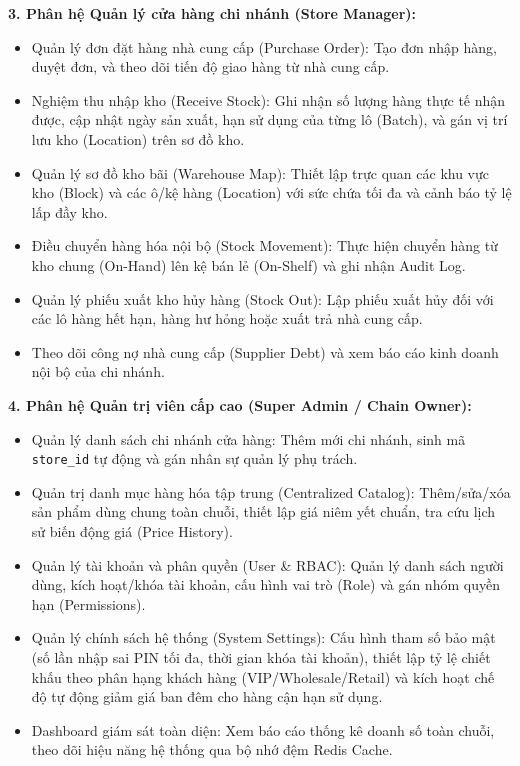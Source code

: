 \documentclass[12pt,a4paper]{report}
\begin{document}
\textbf{3. Phân hệ Quản lý cửa hàng chi nhánh (Store Manager):}
\begin{itemize}[leftmargin=1.5cm]
    \item Quản lý đơn đặt hàng nhà cung cấp (Purchase Order): Tạo đơn nhập hàng, duyệt đơn, và theo dõi tiến độ giao hàng từ nhà cung cấp.
    \item Nghiệm thu nhập kho (Receive Stock): Ghi nhận số lượng hàng thực tế nhận được, cập nhật ngày sản xuất, hạn sử dụng của từng lô (Batch), và gán vị trí lưu kho (Location) trên sơ đồ kho.
    \item Quản lý sơ đồ kho bãi (Warehouse Map): Thiết lập trực quan các khu vực kho (Block) và các ô/kệ hàng (Location) với sức chứa tối đa và cảnh báo tỷ lệ lấp đầy kho.
    \item Điều chuyển hàng hóa nội bộ (Stock Movement): Thực hiện chuyển hàng từ kho chung (On-Hand) lên kệ bán lẻ (On-Shelf) và ghi nhận Audit Log.
    \item Quản lý phiếu xuất kho hủy hàng (Stock Out): Lập phiếu xuất hủy đối với các lô hàng hết hạn, hàng hư hỏng hoặc xuất trả nhà cung cấp.
    \item Theo dõi công nợ nhà cung cấp (Supplier Debt) và xem báo cáo kinh doanh nội bộ của chi nhánh.
\end{itemize}

\textbf{4. Phân hệ Quản trị viên cấp cao (Super Admin / Chain Owner):}
\begin{itemize}[leftmargin=1.5cm]
    \item Quản lý danh sách chi nhánh cửa hàng: Thêm mới chi nhánh, sinh mã \texttt{store\_id} tự động và gán nhân sự quản lý phụ trách.
    \item Quản trị danh mục hàng hóa tập trung (Centralized Catalog): Thêm/sửa/xóa sản phẩm dùng chung toàn chuỗi, thiết lập giá niêm yết chuẩn, tra cứu lịch sử biến động giá (Price History).
    \item Quản lý tài khoản và phân quyền (User \& RBAC): Quản lý danh sách người dùng, kích hoạt/khóa tài khoản, cấu hình vai trò (Role) và gán nhóm quyền hạn (Permissions).
    \item Quản lý chính sách hệ thống (System Settings): Cấu hình tham số bảo mật (số lần nhập sai PIN tối đa, thời gian khóa tài khoản), thiết lập tỷ lệ chiết khấu theo phân hạng khách hàng (VIP/Wholesale/Retail) và kích hoạt chế độ tự động giảm giá ban đêm cho hàng cận hạn sử dụng.
    \item Dashboard giám sát toàn diện: Xem báo cáo thống kê doanh số toàn chuỗi, theo dõi hiệu năng hệ thống qua bộ nhớ đệm Redis Cache.
\end{itemize}
\end{document}
